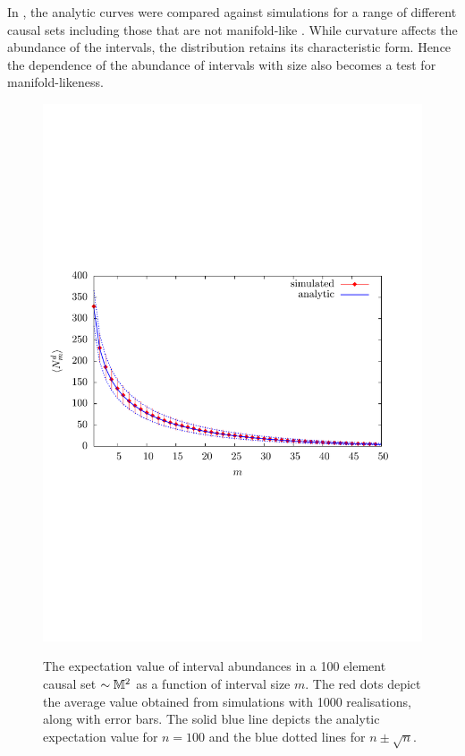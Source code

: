 In \cite{intervals}, the analytic curves
were compared  against simulations for a range of different causal sets including those that are not manifold-like . While
curvature affects the abundance of the intervals, the distribution retains its characteristic form. Hence
the dependence of the abundance of intervals with size  also becomes a test for manifold-likeness.
\begin{figure}[ht]
  \centering \resizebox{4in}{!} {\includegraphics[width=\textwidth]{Mod-2d100}} 
  \caption{{The expectation value of interval abundances in a 100 element causal set $\sim \mathbb M^2$ as a function of
      interval size $m$. The red dots depict the average value obtained from simulations with  1000 realisations,  along with error
  bars. The solid blue line depicts the analytic expectation value for $n=100$ and the blue dotted lines for $n\pm
  \sqrt{n}$. } 
  }
\label{intabund.fig}
\end{figure}


